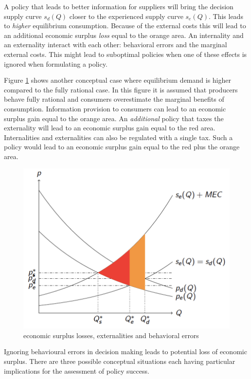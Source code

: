 \documentclass[
]{book}
\begin{document}
A policy that leads to better information for suppliers will bring the decision supply curve \(s_d (Q)\) closer to the experienced supply curve \(s_e (Q)\). This leads to \emph{higher} equilibrium consumption. Because of the external costs this will lead to an additional economic surplus \emph{loss} equal to the orange area. An internality and an externality interact with each other: behavioral errors and the marginal external costs. This might lead to suboptimal policies when one of these effects is ignored when formulating a policy.

Figure \ref{fig:figure7} shows another conceptual case where equilibrium demand is higher compared to the fully rational case. In this figure it is assumed that producers behave fully rational and consumers overestimate the marginal benefits of consumption. Information provision to consumers can lead to an economic surplus gain equal to the orange area. An \emph{additional} policy that taxes the externality will lead to an economic surplus gain equal to the red area. Internalities and externalities can also be regulated with a single tax. Such a policy would lead to an economic surplus gain equal to the red plus the orange area.

\begin{figure}
\includegraphics[width=11.86in]{./figures/figure7} \caption{economic surplus losses, externalities and behavioral errors}\label{fig:figure7}
\end{figure}

Ignoring behavioural errors in decision making leads to potential loss of economic surplus. There are three possible conceptual situations each having particular implications for the assessment of policy success.
\end{document}
